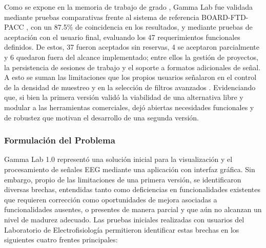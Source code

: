 \documentclass[12pt,letterpaper,oneside]{article}
\begin{document}
Como se expone en la memoria de trabajo de grado \cite{asencio2025}, Gamma Lab fue validada mediante pruebas comparativas frente al sistema de referencia BOARD-FTD-PACC \cite{gauthier2023}, con un 87.5\% de coincidencia en los resultados, y mediante pruebas de aceptación con el usuario final, evaluando los 47 requerimientos funcionales definidos. De estos, 37 fueron aceptados sin reservas, 4 se aceptaron parcialmente y 6 quedaron fuera del alcance implementado; entre ellos la gestión de proyectos, la persistencia de sesiones de trabajo y el soporte a formatos adicionales de señal. A esto se suman las limitaciones que los propios usuarios señalaron en el control de la densidad de muestreo y en la selección de filtros avanzados \cite{asencio2025}. Evidenciando que, si bien la primera versión validó la viabilidad de una alternativa libre y modular a las herramientas comerciales, dejó abiertas necesidades funcionales y de robustez que motivan el desarrollo de una segunda versión.

\subsubsection{Formulación del Problema}

Gamma Lab 1.0 \cite{asencio2025} representó una solución inicial para la visualización y el procesamiento de señales EEG mediante una aplicación con interfaz gráfica. Sin embargo, propio de las limitaciones de una primera versión, se identificaron diversas brechas, entendidas tanto como deficiencias en funcionalidades existentes que requieren corrección como oportunidades de mejora asociadas a funcionalidades ausentes, o presentes de manera parcial y que aún no alcanzan un nivel de madurez adecuado. Las pruebas iniciales realizadas con usuarios del Laboratorio de Electrofisiología permitieron identificar estas brechas en los siguientes cuatro frentes principales:
\end{document}
